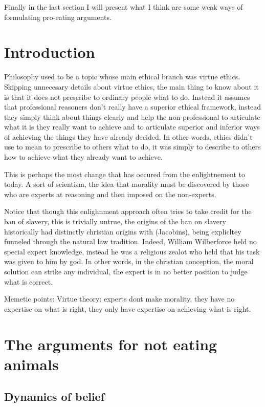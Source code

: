 \documentclass[12pt]{report}
\numberwithin{equation}{section}
\begin{document}
Finally in the last section I will present what I think are some weak ways of formulating pro-eating arguments. 


\chapter{Introduction}

Philosophy used to be a topic whose main ethical branch was virtue ethics. Skipping unnecesary details about virtue ethics, the main thing to know about it is that it does not prescribe to ordinary people what to do. Instead it assumes that professional reasoners don't really have a superior ethical framework, instead they simply think about things clearly and help the non-professional to articulate what it is they really want to achieve and to articulate superior and inferior ways of achieving the things they have already decided. In other words, ethics didn't use to mean to prescribe to others what to do, it was simply to describe to others how to achieve what they already want to achieve. 

This is perhaps the most change that has occured from the enlightnement to today. A sort of scientism, the idea that morality must be discovered by those who are experts at reasoning and then imposed on the non-experts. 

Notice that though this enlighnment approach often tries to take credit for the ban of slavery, this is trivially untrue, the origins of the ban on slavery historically had distinctly christian origins with (Jacobins), being explicltey funneled through the natural law tradition. Indeed, William Wilberforce held no special expert knowledge, instead he was a religious zealot who held that his task was given to him by god. In other words, in the christian conception, the moral solution can strike any individual, the expert is in no better position to judge what is correct. 

Memetic points: 
Virtue theory: experts dont make morality, they have no expertise on what is right, they only have expertise on achieving what is right. 


\chapter{The arguments for not eating animals}

\section{Dynamics of belief}
\end{document}

